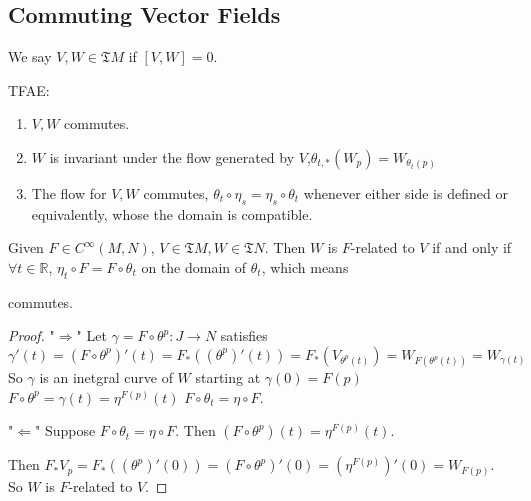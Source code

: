  \subsection{Commuting Vector Fields}
\begin{definition}
    We say  $ V,W\in\mathfrak{T}M $  if  $ [V,W]=0 $.  
\end{definition}
 \begin{theorem}\label{Equivalent condition of Commuting vector fields}
    TFAE:
    \begin{enumerate}[label=\arabic*]
        \item  $ V,W $ commutes.
        \item   $ W $ is invariant under the flow generated by  $ V $,\ie  $ \theta_{t,*}(W_p)=W_{\theta_t(p)} $
        \item The flow for  $ V,W $ commutes, \ie  $ \theta_t\circ \eta_s=\eta_s\circ \theta_t $ whenever either side is defined or equivalently, whose the domain is compatible.     
    \end{enumerate}
 \end{theorem}
\begin{lemma}
     Given  $ F\in C^\infty(M,N) $,  $ V\in\mathfrak{T}M ,W\in \mathfrak{T}N$. Then  $ W $ is  $ F $-related to  $ V $ if and only  if  $ \forall t\in \mathbb{R} $,  $ \eta_t\circ F=F\circ \theta_t $ on the domain of  $ \theta_t $, which means 
    {\begin{center}
        commutes.
    \end{center}
    
     }
      
\end{lemma}
\begin{proof}
    "$ \Rightarrow $" Let  $ \gamma=F\circ \theta^p:J\rightarrow N $ satisfies 
     \[\gamma'(t)=(F\circ \theta^p)'(t)=F_*((\theta^p)'(t))=F_*(V_{\theta^p(t)})=W_{F(\theta^p(t))}=W_{\gamma(t)}\]
     So  $ \gamma $ is an inetgral curve of  $ W $ starting at  $ \gamma(0)=F(p) $\ie  $ F\circ \theta^p =\gamma(t)=\eta^{F(p)}(t)$ \ie  $ F\circ \theta_t=\eta\circ F $.
     
     "$ \Leftarrow $" Suppose  $ F\circ \theta_t =\eta\circ F $. Then   $ (F\circ \theta^p)(t)=\eta^{F(p)}(t) $.
     
     Then  $ F_*V_p=F_*((\theta^p)'(0))=(F\circ \theta^p)'(0)=(\eta^{F(p)})'(0)=W_{F(p)} $. So  $ W $ is  $ F $-related to  $ V $.   
\end{proof}
